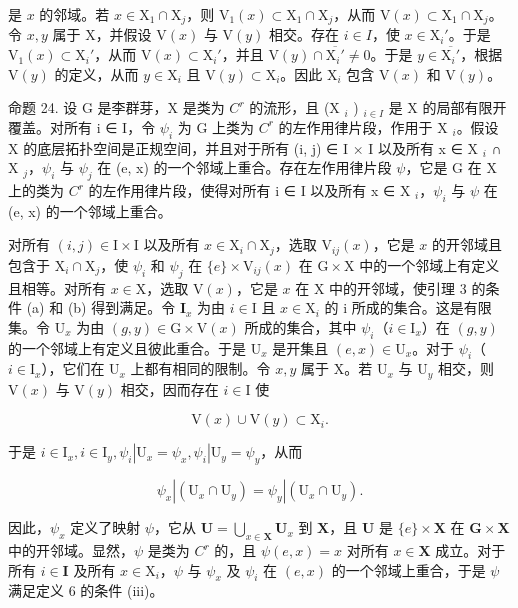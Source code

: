 是 \(x\) 的邻域。若 \(x \in \mathrm{X}_1 \cap \mathrm{X}_j\)，则 \(\mathrm{V}_1(x) \subset \mathrm{X}_1 \cap \mathrm{X}_j\)，从而 \(\mathrm{V}(x) \subset \mathrm{X}_1 \cap \mathrm{X}_j\)。令 \(x, y\) 属于 \(\mathrm{X}\)，并假设 \(\mathrm{V}(x)\) 与 \(\mathrm{V}(y)\) 相交。存在 \(i \in I\)，使 \(x \in \mathrm{X}_i'\)。于是 \(\mathrm{V}_1(x) \subset \mathrm{X}_i'\)，从而 \(\mathrm{V}(x) \subset \mathrm{X}_i'\)，并且 \(\mathrm{V}(y) \cap \overline{\mathrm{X}_i'} \neq 0\)。于是 \(y \in \overline{\mathrm{X}_i'}\)，根据 \(\mathrm{V}(y)\) 的定义，从而 \(y \in \mathrm{X}_i\) 且 \(\mathrm{V}(y) \subset \mathrm{X}_i\)。因此 \(\mathrm{X}_i\) 包含 \(\mathrm{V}(x)\) 和 \(\mathrm{V}(y)\)。

命题 24. 设 G 是李群芽，X 是类为 \(C^{r}\) 的流形，且 (X \(_{i}\) ) \(_{i \in I}\) 是 X 的局部有限开覆盖。对所有 i ∈ I，令 \(\psi_{i}\) 为 G 上类为 \(C^{r}\) 的左作用律片段，作用于 X \(_{i}\)。假设 X 的底层拓扑空间是正规空间，并且对于所有 (i, j) ∈ I × I 以及所有 x ∈ X \(_{i}\) ∩ X \(_{j}\)，\(\psi_{i}\) 与 \(\psi_{j}\) 在 (e, x) 的一个邻域上重合。存在左作用律片段 \(\psi\)，它是 G 在 X 上的类为 \(C^{r}\) 的左作用律片段，使得对所有 i ∈ I 以及所有 x ∈ X \(_{i}\)，\(\psi_{i}\) 与 \(\psi\) 在 (e, x) 的一个邻域上重合。

对所有 \((i,j)\in \mathrm{I}\times \mathrm{I}\) 以及所有 \(x\in \mathrm{X}_i\cap \mathrm{X}_j\)，选取 \(\mathrm{V}_{ij}(x)\)，它是 \(x\) 的开邻域且包含于 \(\mathrm{X}_i\cap \mathrm{X}_j\)，使 \(\psi_i\) 和 \(\psi_j\) 在 \(\{e\} \times \mathrm{V}_{ij}(x)\) 在 \(\mathrm{G}\times \mathrm{X}\) 中的一个邻域上有定义且相等。对所有 \(x\in \mathrm{X}\)，选取 \(\mathrm{V}(x)\)，它是 \(x\) 在 \(\mathrm{X}\) 中的开邻域，使引理 3 的条件 (a) 和 (b) 得到满足。令 \(\mathbf{I}_x\) 为由 \(i\in \mathrm{I}\) 且 \(x\in \mathrm{X}_i\) 的 i 所成的集合。这是有限集。令 \(\mathrm{U}_x\) 为由 \((g,y)\in \mathrm{G}\times \mathrm{V}(x)\) 所成的集合，其中 \(\psi_i\)（\(i\in \mathrm{I}_x\)）在 \((g,y)\) 的一个邻域上有定义且彼此重合。于是 \(\mathrm{U}_x\) 是开集且 \((e,x)\in \mathrm{U}_x\)。对于 \(\psi_i\)（\(i\in \mathrm{I}_x\)），它们在 \(\mathrm{U}_x\) 上都有相同的限制。令 \(x,y\) 属于 \(\mathrm{X}\)。若 \(\mathrm{U}_x\) 与 \(\mathrm{U}_y\) 相交，则 \(\mathrm{V}(x)\) 与 \(\mathrm{V}(y)\) 相交，因而存在 \(i\in \mathrm{I}\) 使

\[
\mathrm{V} (x) \cup \mathrm{V} (y) \subset \mathrm{X} _ {i}.
\]

于是 \(i \in \mathrm{I}_x, i \in \mathrm{I}_y, \psi_i | \mathrm{U}_x = \psi_x, \psi_i | \mathrm{U}_y = \psi_y\)，从而

\[
\psi_ {x} | (\mathrm{U} _ {x} \cap \mathrm{U} _ {y}) = \psi_ {y} | (\mathrm{U} _ {x} \cap \mathrm{U} _ {y}).
\]

因此，\(\psi_x\) 定义了映射 \(\psi\)，它从 \(\mathbf{U} = \bigcup_{x\in \mathbf{X}}\mathbf{U}_x\) 到 \(\mathbf{X}\)，且 \(\mathbf{U}\) 是 \(\{e\} \times \mathbf{X}\) 在 \(\mathbf{G}\times \mathbf{X}\) 中的开邻域。显然，\(\psi\) 是类为 \(C^r\) 的，且 \(\psi (e,x) = x\) 对所有 \(x\in \mathbf{X}\) 成立。对于所有 \(i\in \mathbf{I}\) 及所有 \(x\in \mathrm{X}_i\)，\(\psi\) 与 \(\psi_x\) 及 \(\psi_i\) 在 \((e,x)\) 的一个邻域上重合，于是 \(\psi\) 满足定义 6 的条件 (iii)。

